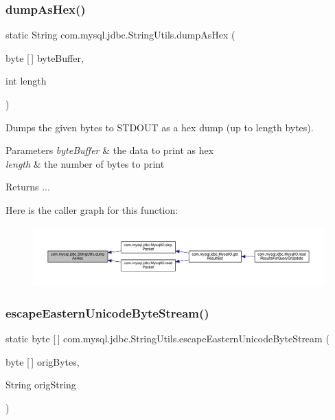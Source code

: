 \subsubsection{\texorpdfstring{dump\+As\+Hex()}{dumpAsHex()}}
{\footnotesize\ttfamily static String com.\+mysql.\+jdbc.\+String\+Utils.\+dump\+As\+Hex (\begin{DoxyParamCaption}\item[{byte \mbox{[}$\,$\mbox{]}}]{byte\+Buffer,  }\item[{int}]{length }\end{DoxyParamCaption})\hspace{0.3cm}{\ttfamily [static]}}

Dumps the given bytes to S\+T\+D\+O\+UT as a hex dump (up to length bytes).


\begin{DoxyParams}{Parameters}
{\em byte\+Buffer} & the data to print as hex \\
\hline
{\em length} & the number of bytes to print\\
\hline
\end{DoxyParams}
\begin{DoxyReturn}{Returns}
... 
\end{DoxyReturn}
Here is the caller graph for this function\+:
\nopagebreak
\begin{figure}[H]
\begin{center}
\leavevmode
\includegraphics[width=350pt]{classcom_1_1mysql_1_1jdbc_1_1_string_utils_ae709b9204f54ce98657cd4133619961b_icgraph}
\end{center}
\end{figure}
\mbox{\label{classcom_1_1mysql_1_1jdbc_1_1_string_utils_a7d62af1e510047299adcf569e5d94c84}} 
\subsubsection{\texorpdfstring{escape\+Eastern\+Unicode\+Byte\+Stream()}{escapeEasternUnicodeByteStream()}}
{\footnotesize\ttfamily static byte \mbox{[}$\,$\mbox{]} com.\+mysql.\+jdbc.\+String\+Utils.\+escape\+Eastern\+Unicode\+Byte\+Stream (\begin{DoxyParamCaption}\item[{byte \mbox{[}$\,$\mbox{]}}]{orig\+Bytes,  }\item[{String}]{orig\+String }\end{DoxyParamCaption})\hspace{0.3cm}{\ttfamily [static]}}

